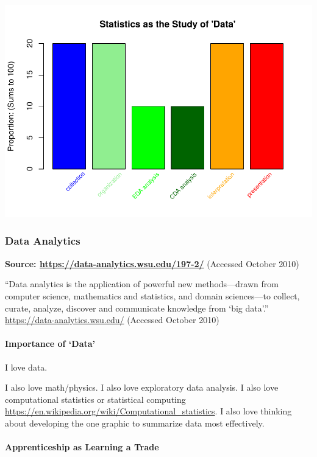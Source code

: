 \documentclass[
]{article}
\begin{document}
\includegraphics{graphics/chunk-conclusion-equally-likely-1.pdf}

\hypertarget{data-analytics}{%
\subsubsection{Data Analytics}\label{data-analytics}}

\textbf{Source: \url{https://data-analytics.wsu.edu/197-2/} } (Accessed
October 2010)

``Data analytics is the application of powerful new methods---drawn from
computer science, mathematics and statistics, and domain sciences---to
collect, curate, analyze, discover and communicate knowledge from `big
data'.'' \url{https://data-analytics.wsu.edu/} (Accessed October 2010)

\hypertarget{importance-of-data}{%
\paragraph{Importance of `Data'}\label{importance-of-data}}

I love data.

I also love math/physics. I also love exploratory data analysis. I also
love computational statistics or statistical computing
\url{https://en.wikipedia.org/wiki/Computational_statistics}. I also
love thinking about developing the one graphic to summarize data most
effectively.

\hypertarget{apprenticeship-as-learning-a-trade}{%
\paragraph{Apprenticeship as Learning a
Trade}\label{apprenticeship-as-learning-a-trade}}
\end{document}
